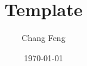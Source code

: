 \documentclass[11pt]{article}
\theoremstyle{plain}
\numberwithin{equation}{section}
\theoremstyle{definition}
\begin{document}
\title{ Template }
\author{Chang Feng}
\date{\today}

\maketitle
\end{document}

